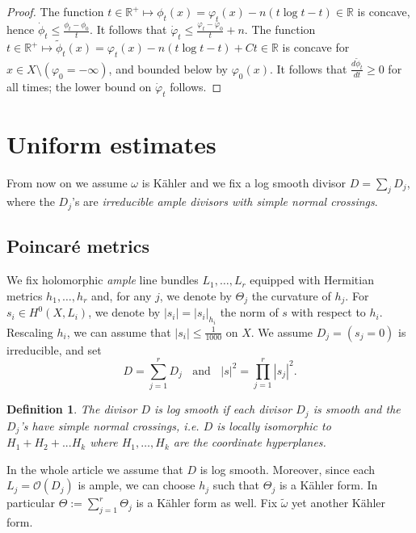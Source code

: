 \documentclass[11pt]{amsart}
\numberwithin{equation}{section}
\newtheorem{defi}[theorem]{Definition}
\newcommand{\R}{\mathbb R}
\newcommand{\f}{\varphi}
\begin{document}
\begin{proof}
\smallskip


The function $t \in \R^+ \mapsto {\phi}_t(x)=\f_t(x)-n(t\log t-t) \in \R$  is concave,
hence $\dot{\phi}_t\leq \frac{\phi_t-\phi_0}{t}$. It follows that $\dot{\f}_t\leq \frac{\f_t-\f_0}{t}+n$.
The function  $t \in \R^+ \mapsto \tilde{\phi}_t(x)=\f_t(x)-n(t\log t-t) +C t \in \R$ is concave 
for   $x \in X \setminus (\f_0=-\infty)$,  and bounded below by $\f_0(x)$.
It follows 
that $\frac{d \tilde{\phi}_t}{dt} \geq 0$ 
for all times; the lower bound on $\dot{\varphi}_t$ follows.
\end{proof}
 
 
 
 
 
 
 
 
 \section{Uniform estimates} \label{sec:uniform}
 
  From now on we assume $\omega$ is K\"ahler and we fix a log smooth divisor $D=\sum_j D_j$, where the $D_j$'s are 
  {\it irreducible ample divisors with simple normal crossings}.
 
  
 
 

\subsection{Poincaré metrics} \label{subsect: Poincare}

  

We fix holomorphic \emph{ample} line bundles $L_1,\ldots,L_r$ equipped with Hermitian metrics $h_1,\ldots,h_r$ and, for any $j$, we denote by $\Theta_j$ the curvature of $h_j$.
For $s_i \in H^0(X,L_i)$, we denote by $|s_i|=|s_i|_{h_i}$ the norm of $s$ with respect to  $h_i$. 
Rescaling $h_i$, we can assume that $|s_i|\leq \frac{1}{1000}$ on $X$. 
We assume  $D_j=(s_j=0)$ is irreducible, and set
$$
D=\sum_{j=1}^r D_j
\; \; \text{ and } \; \;
|s|^2=\prod_{j=1}^r |s_j|^2.
$$

\begin{defi}
The divisor $D$ is {\it log smooth} if each divisor $D_j$ is smooth and the $D_j$'s have simple normal crossings,
 i.e. $D$ is locally isomorphic to $H_1 + H_2 + ...H_k$ where 
 $H_1,\ldots,H_k$ are the coordinate hyperplanes.  
\end{defi}

In the whole article we assume that $D$ is log smooth. Moreover, since each $L_j=\mathcal{O}(D_j)$ is ample, we can choose $h_j$ such that $ \Theta_j$ is a K\"ahler form. In particular $ \Theta:=\sum_{j=1}^r \Theta_j$ is a K\"ahler form as well. 
Fix $\tilde{\omega}$ yet another K\"ahler form.
\end{document}
